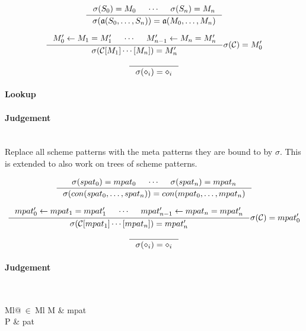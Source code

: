 \[
\inference
{
  \sigma(S_0) = M_0 &
  \cdots &
  \sigma(S_n) = M_n
}
{
  \sigma (\mathfrak{a} (S_0, \ldots, S_n)) =
  \mathfrak{a} (M_0, \ldots, M_n)
}
\]

\[
\inference
{
  M'_0 <- M_1 = M'_1 &
  \cdots &
  M'_{n-1} <- M_n = M'_n
}
{
  \sigma (\mathcal{C}[M_1]\cdots[M_n]) = M'_n
}
{
  \sigma(\mathcal{C}) = M'_0
}
\]

\[
\inference
{
}
{
  \sigma(\diamond_i) = \diamond_i
}
\]


\paragraph{Lookup}

\paragraph{Judgement} \\

Replace all scheme patterns with the meta patterns they are bound to by
$\sigma$. This is extended to also work on trees of scheme patterns.

\[
\inference
{
  \sigma(spat_0) = mpat_0 &
  \cdots &
  \sigma(spat_n) = mpat_n
}
{
  \sigma (con (spat_0, \ldots, spat_n)) =
  con (mpat_0, \ldots, mpat_n)
}
\]

\[
\inference
{
  mpat'_0 <- mpat_1 = mpat'_1 &
  \cdots &
  mpat'_{n-1} <- mpat_n = mpat'_n
}
{
  \sigma (\mathcal{C}[mpat_1]\cdots[mpat_n]) = mpat'_n
}
{
  \sigma(\mathcal{C}) = mpat'_0
}
\]

\[
\inference
{
}
{
  \sigma(\diamond_i) = \diamond_i
}
\]

\clearpage

\paragraph{Judgement} \\
\indent\begin{tabular}{Ml@{$\ \in\ $}Ml}
  M & mpat\\
  P & pat
\end{tabular}\\

